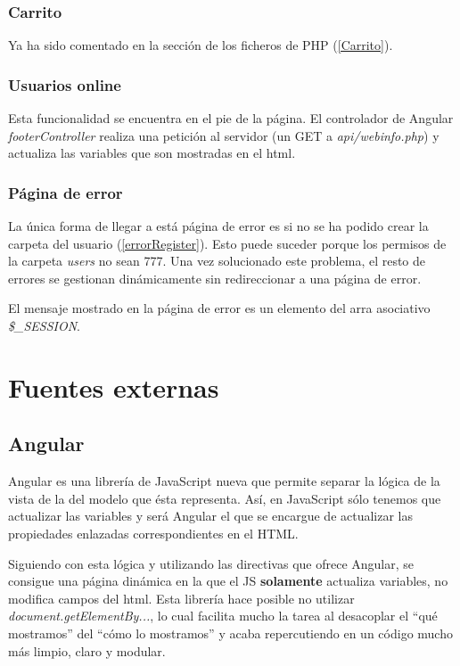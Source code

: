 \documentclass{apuntes}
\begin{document}
\subsubsection{Carrito}

Ya ha sido comentado en la sección de los ficheros de PHP  (\ref{Carrito}).

\subsubsection{Usuarios online}

Esta funcionalidad se encuentra en el pie de la página. El controlador de Angular \textit{footerController} realiza una petición al servidor (un GET a \textit{api/webinfo.php}) y actualiza las variables que son mostradas en el html.


\subsubsection{Página de error}

La única forma de llegar a está página de error es si no se ha podido crear la carpeta del usuario (\ref{errorRegister}). Esto puede suceder porque los permisos de la carpeta \textit{users} no sean 777. Una vez solucionado este problema, el resto de errores se gestionan dinámicamente sin redireccionar a una página de error. 

El mensaje mostrado en la página de error es un elemento del arra asociativo \textit{\$\_SESSION}.

\section{Fuentes externas}

\subsection{Angular}
\label{Angular}

Angular es una librería de JavaScript nueva que permite separar la lógica de la vista de la del modelo que ésta representa. Así, en JavaScript sólo tenemos que actualizar las variables y será Angular el que se encargue de actualizar las propiedades enlazadas correspondientes en el HTML.

Siguiendo con esta lógica y utilizando las directivas que ofrece Angular, se consigue una página dinámica en la que el JS \textbf{solamente} actualiza variables, no modifica campos del html. Esta librería hace posible no utilizar \textit{document.getElementBy...}, lo cual facilita mucho la tarea al desacoplar el ``qué mostramos'' del ``cómo lo mostramos'' y acaba repercutiendo en un código mucho más limpio, claro y modular.
\end{document}
